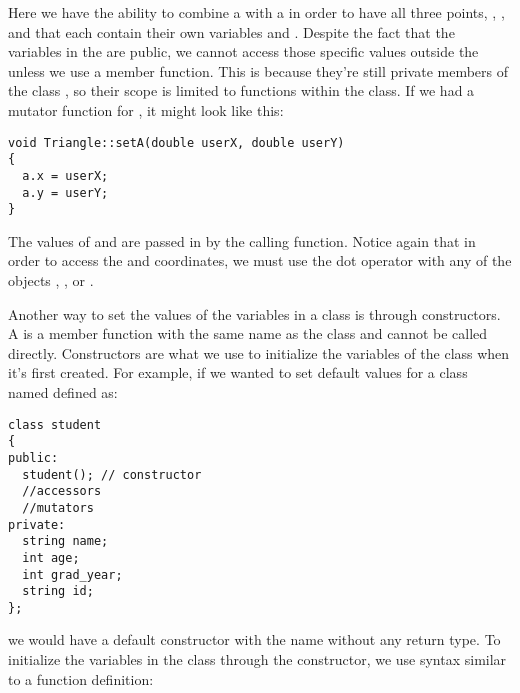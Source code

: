 Here we have the ability to combine a  with a  in order to have all three points, , , and  that each contain their own variables  and .
Despite the fact that the variables in the  are public, we cannot access those specific values outside the  unless we use a member function. 
This is because they're still private members of the class , so their scope is limited to functions within the class. 
If we had a mutator function for , it might look like this:

\noindent\begin{minipage}{\linewidth}\begin{lstlisting}
void Triangle::setA(double userX, double userY)
{
  a.x = userX;
  a.y = userY;
}
\end{lstlisting}\end{minipage}

The values of  and  are passed in by the calling function. 
Notice again that in order to access the  and  coordinates, we must use the dot operator with any of the  objects , , or .



Another way to set the values of the variables in a class is through constructors. 
A  is a member function with the same name as the class and cannot be called directly. 
Constructors are what we use to initialize the variables of the class when it's first created. 
For example, if we wanted to set default values for a class named  defined as: 

\noindent\begin{minipage}{\linewidth}\begin{lstlisting}
class student
{
public:
  student(); // constructor
  //accessors
  //mutators
private:
  string name;
  int age;
  int grad_year;
  string id;
};
\end{lstlisting}\end{minipage}

\noindent we would have a default constructor with the name  without any return type. 
To initialize the variables in the class through the constructor, we use syntax similar to a function definition:

